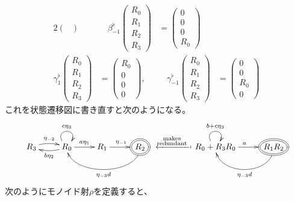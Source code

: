{\begin{alignat*}{2}
\begin{pmatrix}
		\end{pmatrix} &\quad \beta_{-1}^\flat\begin{pmatrix}
			R_0 \\ R_1 \\ R_2 \\ R_3
		\end{pmatrix} &= \begin{pmatrix}
			0 \\ 0 \\ 0 \\ R_0
		\end{pmatrix} \\
		\gamma_1^\flat\begin{pmatrix}
			R_0 \\ R_1 \\ R_2 \\ R_3
		\end{pmatrix} &= \begin{pmatrix}
			R_0 \\ 0 \\ 0 \\ 0
		\end{pmatrix}, &\quad \gamma_{-1}^\flat\begin{pmatrix}
			R_0 \\ R_1 \\ R_2 \\ R_3
		\end{pmatrix} &= \begin{pmatrix}
			0 \\ 0 \\ R_0 \\ 0
		\end{pmatrix}
	\end{alignat*}
	これを状態遷移図に書き直すと次のようになる。
	\begin{equation*}\begin{split}
		\xymatrix{
			R_3 \ar@/^1ex/[r]^{\eta_{-2}} 
			& R_0 \ar[r]^{a\eta_1} \ar@/^1ex/[l]^{b\eta_2} \ar@(ul,ur)^{c\eta_3}
			& R_1 \ar[r]^{\eta_{-1}} 
			& *++[o][F=]{R_2} \ar@(d,d)[ll]^{\eta_{-3}d} \\
		} \xmapsfrom{\substack{\text{ makes}\\\text{ redundant}}} \xymatrix{
			R_0 + R_3R_0 \ar[r]^{a} \ar@(ul,ur)^{b + c\eta_3}
			& *++[o][F=]{R_1R_2} \ar@(d,d)[l]^{\eta_{-3}d} \\
		}
	\end{split}\end{equation*}
	次のようにモノイド射$\rho$を定義すると、
	\begin{equation*}\begin{split}

\end{split}
\end{equation*}}
